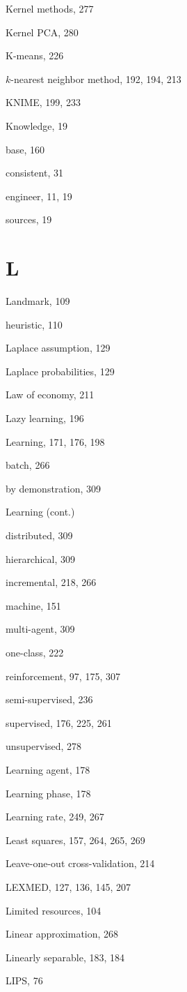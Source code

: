 \documentclass[10pt]{book}
\begin{document}
Kernel methods, 277

Kernel PCA, 280

K-means, 226

$k$-nearest neighbor method, 192, 194, 213

KNIME, 199, 233

Knowledge, 19

base, 160

consistent, 31

engineer, 11, 19

sources, 19

\section{L}
Landmark, 109

heuristic, 110

Laplace assumption, 129

Laplace probabilities, 129

Law of economy, 211

Lazy learning, 196

Learning, 171, 176, 198

batch, 266

by demonstration, 309

Learning (cont.)

distributed, 309

hierarchical, 309

incremental, 218, 266

machine, 151

multi-agent, 309

one-class, 222

reinforcement, 97, 175, 307

semi-supervised, 236

supervised, 176, 225, 261

unsupervised, 278

Learning agent, 178

Learning phase, 178

Learning rate, 249, 267

Least squares, 157, 264, 265, 269

Leave-one-out cross-validation, 214

LEXMED, 127, 136, 145, 207

Limited resources, 104

Linear approximation, 268

Linearly separable, 183, 184

LIPS, 76
\end{document}

